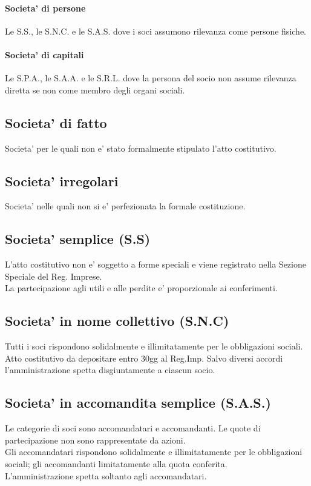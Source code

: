\documentclass{report}
\begin{document}
	\paragraph{Societa' di persone}Le S.S., le S.N.C. e le S.A.S. dove i soci assumono rilevanza come persone fisiche.
	\paragraph{Societa' di capitali}Le S.P.A., le S.A.A. e le S.R.L. dove la persona del socio non assume rilevanza diretta se non come membro degli organi sociali.
	\subsection{Societa' di fatto}
	Societa' per le quali non e' stato formalmente stipulato l'atto costitutivo.
	\subsection{Societa' irregolari}
	Societa' nelle quali non si e' perfezionata la formale costituzione.
	\subsection{Societa' semplice (S.S)}
	L'atto costitutivo non e' soggetto a forme speciali e viene registrato nella Sezione Speciale del Reg. Imprese.\medskip \\La partecipazione agli utili e alle perdite e' proporzionale ai conferimenti.
	\subsection{Societa' in nome collettivo (S.N.C)}
	Tutti i soci rispondono solidalmente e illimitatamente per le obbligazioni sociali. Atto costitutivo da depositare entro 30gg al Reg.Imp. Salvo diversi accordi l'amministrazione spetta disgiuntamente a ciascun socio.
	\subsection{Societa' in accomandita semplice (S.A.S.)}
	Le categorie di soci sono accomandatari e accomandanti. Le quote di partecipazione non sono rappresentate da azioni.\medskip \\Gli accomandatari rispondono solidalmente e illimitatamente per le obbligazioni sociali; gli accomandanti limitatamente alla quota conferita.\medskip \\
	L'amministrazione spetta soltanto agli accomandatari.
\end{document}

